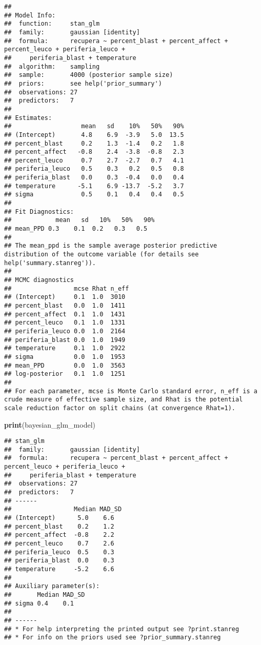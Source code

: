 \documentclass[
]{article}
\newenvironment{Shaded}{\begin{snugshade}}{\end{snugshade}}
\newcommand{\FunctionTok}[1]{\textcolor[rgb]{0.13,0.29,0.53}{\textbf{#1}}}
\newcommand{\NormalTok}[1]{#1}
\begin{document}
\begin{verbatim}
## 
## Model Info:
##  function:     stan_glm
##  family:       gaussian [identity]
##  formula:      recupera ~ percent_blast + percent_affect + percent_leuco + periferia_leuco + 
##     periferia_blast + temperature
##  algorithm:    sampling
##  sample:       4000 (posterior sample size)
##  priors:       see help('prior_summary')
##  observations: 27
##  predictors:   7
## 
## Estimates:
##                   mean   sd    10%   50%   90%
## (Intercept)       4.8    6.9  -3.9   5.0  13.5
## percent_blast     0.2    1.3  -1.4   0.2   1.8
## percent_affect   -0.8    2.4  -3.8  -0.8   2.3
## percent_leuco     0.7    2.7  -2.7   0.7   4.1
## periferia_leuco   0.5    0.3   0.2   0.5   0.8
## periferia_blast   0.0    0.3  -0.4   0.0   0.4
## temperature      -5.1    6.9 -13.7  -5.2   3.7
## sigma             0.5    0.1   0.4   0.4   0.5
## 
## Fit Diagnostics:
##            mean   sd   10%   50%   90%
## mean_PPD 0.3    0.1  0.2   0.3   0.5  
## 
## The mean_ppd is the sample average posterior predictive distribution of the outcome variable (for details see help('summary.stanreg')).
## 
## MCMC diagnostics
##                 mcse Rhat n_eff
## (Intercept)     0.1  1.0  3010 
## percent_blast   0.0  1.0  1411 
## percent_affect  0.1  1.0  1431 
## percent_leuco   0.1  1.0  1331 
## periferia_leuco 0.0  1.0  2164 
## periferia_blast 0.0  1.0  1949 
## temperature     0.1  1.0  2922 
## sigma           0.0  1.0  1953 
## mean_PPD        0.0  1.0  3563 
## log-posterior   0.1  1.0  1251 
## 
## For each parameter, mcse is Monte Carlo standard error, n_eff is a crude measure of effective sample size, and Rhat is the potential scale reduction factor on split chains (at convergence Rhat=1).
\end{verbatim}

\begin{Shaded}
\begin{Highlighting}[]
\FunctionTok{print}\NormalTok{(bayesian\_glm\_model)}
\end{Highlighting}
\end{Shaded}

\begin{verbatim}
## stan_glm
##  family:       gaussian [identity]
##  formula:      recupera ~ percent_blast + percent_affect + percent_leuco + periferia_leuco + 
##     periferia_blast + temperature
##  observations: 27
##  predictors:   7
## ------
##                 Median MAD_SD
## (Intercept)      5.0    6.6  
## percent_blast    0.2    1.2  
## percent_affect  -0.8    2.2  
## percent_leuco    0.7    2.6  
## periferia_leuco  0.5    0.3  
## periferia_blast  0.0    0.3  
## temperature     -5.2    6.6  
## 
## Auxiliary parameter(s):
##       Median MAD_SD
## sigma 0.4    0.1   
## 
## ------
## * For help interpreting the printed output see ?print.stanreg
## * For info on the priors used see ?prior_summary.stanreg
\end{verbatim}
\end{document}
